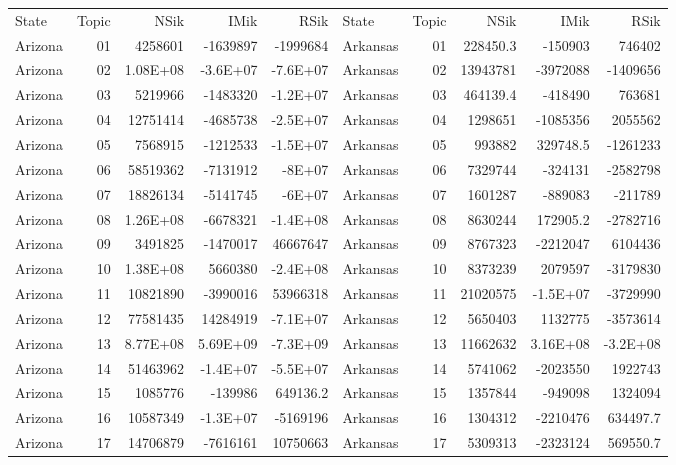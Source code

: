 \begin{table}[]
	\footnotesize
	\begin{tabular}{lrrrrlrrrr}
		State & Topic & NSik & IMik & RSik & State & Topic & NSik & IMik & RSik \\
		Arizona &  01  & 4258601 & -1639897 & -1999684 & Arkansas &  01  & 228450.3 & -150903 & 746402 \\
		Arizona &  02  & 1.08E+08 & -3.6E+07 & -7.6E+07 & Arkansas &  02  & 13943781 & -3972088 & -1409656 \\
		Arizona &  03  & 5219966 & -1483320 & -1.2E+07 & Arkansas &  03  & 464139.4 & -418490 & 763681 \\
		Arizona &  04  & 12751414 & -4685738 & -2.5E+07 & Arkansas &  04  & 1298651 & -1085356 & 2055562 \\
		Arizona &  05  & 7568915 & -1212533 & -1.5E+07 & Arkansas &  05  & 993882 & 329748.5 & -1261233 \\
		Arizona &  06  & 58519362 & -7131912 & -8E+07 & Arkansas &  06  & 7329744 & -324131 & -2582798 \\
		Arizona &  07  & 18826134 & -5141745 & -6E+07 & Arkansas &  07  & 1601287 & -889083 & -211789 \\
		Arizona &  08  & 1.26E+08 & -6678321 & -1.4E+08 & Arkansas &  08  & 8630244 & 172905.2 & -2782716 \\
		Arizona &  09  & 3491825 & -1470017 & 46667647 & Arkansas &  09  & 8767323 & -2212047 & 6104436 \\
		Arizona &  10 & 1.38E+08 & 5660380 & -2.4E+08 & Arkansas &  10 & 8373239 & 2079597 & -3179830 \\
		Arizona &  11 & 10821890 & -3990016 & 53966318 & Arkansas &  11 & 21020575 & -1.5E+07 & -3729990 \\
		Arizona &  12 & 77581435 & 14284919 & -7.1E+07 & Arkansas &  12 & 5650403 & 1132775 & -3573614 \\
		Arizona &  13 & 8.77E+08 & 5.69E+09 & -7.3E+09 & Arkansas &  13 & 11662632 & 3.16E+08 & -3.2E+08 \\
		Arizona &  14 & 51463962 & -1.4E+07 & -5.5E+07 & Arkansas &  14 & 5741062 & -2023550 & 1922743 \\
		Arizona &  15 & 1085776 & -139986 & 649136.2 & Arkansas &  15 & 1357844 & -949098 & 1324094 \\
		Arizona &  16 & 10587349 & -1.3E+07 & -5169196 & Arkansas &  16 & 1304312 & -2210476 & 634497.7 \\
		Arizona &  17 & 14706879 & -7616161 & 10750663 & Arkansas &  17 & 5309313 & -2323124 & 569550.7 \\

\end{tabular}
\end{table}
